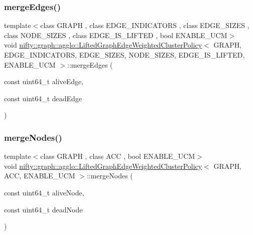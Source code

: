 \subsubsection{\texorpdfstring{merge\+Edges()}{mergeEdges()}\hspace{0.1cm}{\footnotesize\ttfamily [2/2]}}
{\footnotesize\ttfamily template$<$class G\+R\+A\+PH , class E\+D\+G\+E\+\_\+\+I\+N\+D\+I\+C\+A\+T\+O\+RS , class E\+D\+G\+E\+\_\+\+S\+I\+Z\+ES , class N\+O\+D\+E\+\_\+\+S\+I\+Z\+ES , class E\+D\+G\+E\+\_\+\+I\+S\+\_\+\+L\+I\+F\+T\+ED , bool E\+N\+A\+B\+L\+E\+\_\+\+U\+CM$>$ \\
void \hyperlink{classnifty_1_1graph_1_1agglo_1_1LiftedGraphEdgeWeightedClusterPolicy}{nifty\+::graph\+::agglo\+::\+Lifted\+Graph\+Edge\+Weighted\+Cluster\+Policy}$<$ G\+R\+A\+PH, E\+D\+G\+E\+\_\+\+I\+N\+D\+I\+C\+A\+T\+O\+RS, E\+D\+G\+E\+\_\+\+S\+I\+Z\+ES, N\+O\+D\+E\+\_\+\+S\+I\+Z\+ES, E\+D\+G\+E\+\_\+\+I\+S\+\_\+\+L\+I\+F\+T\+ED, E\+N\+A\+B\+L\+E\+\_\+\+U\+CM $>$\+::merge\+Edges (\begin{DoxyParamCaption}\item[{const uint64\+\_\+t}]{alive\+Edge,  }\item[{const uint64\+\_\+t}]{dead\+Edge }\end{DoxyParamCaption})\hspace{0.3cm}{\ttfamily [inline]}}

\mbox{\label{classnifty_1_1graph_1_1agglo_1_1LiftedGraphEdgeWeightedClusterPolicy_afd367a30ccd5dfb8a5d4f031611e22fb}} 
\subsubsection{\texorpdfstring{merge\+Nodes()}{mergeNodes()}\hspace{0.1cm}{\footnotesize\ttfamily [1/2]}}
{\footnotesize\ttfamily template$<$class G\+R\+A\+PH , class A\+CC , bool E\+N\+A\+B\+L\+E\+\_\+\+U\+CM$>$ \\
void \hyperlink{classnifty_1_1graph_1_1agglo_1_1LiftedGraphEdgeWeightedClusterPolicy}{nifty\+::graph\+::agglo\+::\+Lifted\+Graph\+Edge\+Weighted\+Cluster\+Policy}$<$ G\+R\+A\+PH, A\+CC, E\+N\+A\+B\+L\+E\+\_\+\+U\+CM $>$\+::merge\+Nodes (\begin{DoxyParamCaption}\item[{const uint64\+\_\+t}]{alive\+Node,  }\item[{const uint64\+\_\+t}]{dead\+Node }\end{DoxyParamCaption})}

